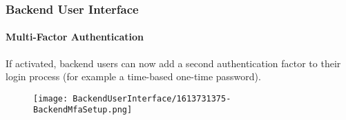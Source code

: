 %

\begin{frame}[fragile]
	\frametitle{Backend User Interface}
	\framesubtitle{Multi-Factor Authentication}

	If activated, backend users can now add a second authentication factor to
	their login process (for example a time-based one-time password).

	\begin{figure}
		\texttt{[image: BackendUserInterface/1613731375-BackendMfaSetup.png]}
	\end{figure}

\end{frame}

